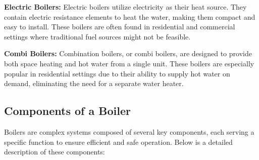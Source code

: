 \textbf{Electric Boilers:}
Electric boilers utilize electricity as their heat source. They contain electric resistance elements to heat the water, making them compact and easy to install. These boilers are often found in residential and commercial settings where traditional fuel sources might not be feasible.

\textbf{Combi Boilers: }
Combination boilers, or combi boilers, are designed to provide both space heating and hot water from a single unit. These boilers are especially popular in residential settings due to their ability to supply hot water on demand, eliminating the need for a separate water heater.

\subsection{Components of a Boiler}
Boilers are complex systems composed of several key components, each serving a specific function to ensure efficient and safe operation. Below is a detailed description of these components:

